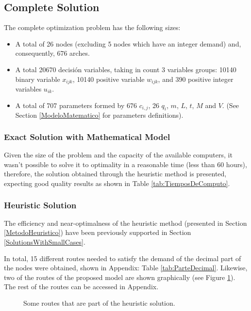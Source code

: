 \documentclass{amsart}
\begin{document}
    
            \subsection{Complete Solution}
            
            The complete optimization problem has the following sizes:
        \begin{itemize}
            \item A total of 26 nodes (excluding 5 nodes which have an integer demand) and, consequently, 676 arches.
            \item A total 20670 decisión variables, taking in count 3 variables groups: 10140 binary variable $x_{ijk}$, 10140 positive variable $w_{ijk}$, and 390 positive integer variables $u_{ik}$. 
            \item A total of 707 parameters formed by 676 $c_{i,j}$, 26 $q_i$, $m$, $L$, $t$, $M$ and $V$. (See Section \ref{ModeloMatematico} for parameters definitions).
        \end{itemize}
        
            \subsubsection{Exact Solution with Mathematical Model}
            Given the size of the problem and the capacity of the available computers, it wasn't possible to solve it to optimality in a reasonable time (less than 60 hours), therefore, the solution obtained through the heuristic method is presented, expecting good quality results as shown in Table \ref{tab:TiemposDeComputo}.
            
            \subsubsection{Heuristic Solution}
            The efficiency and near-optimalness of the heuristic method (presented in Section \ref{MetodoHeuristico}) have been previously supported in Section \ref{SolutionsWithSmallCases}.
            
            In total, 15 different routes needed to satisfy the demand of the decimal part of the nodes were obtained, shown in Appendix: Table \ref{tab:ParteDecimal}. Likewise, two of the routes of the proposed model are shown graphically (see Figure \ref{fig:RutasDeEjemplo}). The rest of the routes can be accessed in Appendix.

        \begin{figure}[h!]
            \begin{center}
                \caption{Some routes that are part of the heuristic solution.}
                \label{fig:RutasDeEjemplo}
            \end{center}
        \end{figure}
            
\end{document}
